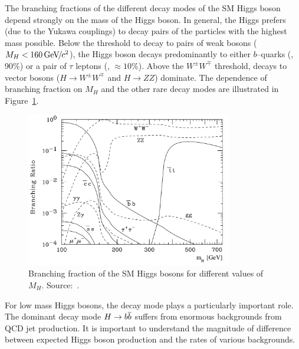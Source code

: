 The branching fractions of the different decay modes of the SM Higgs boson
depend strongly on the mass of the Higgs boson.  In general, the Higgs prefers
(due to the Yukawa couplings) to decay pairs of the particles with the highest
mass possible.  Below the threshold to decay to pairs of weak bosons ($M_H <
160 {\,\text{Ge\hspace{-.08em}V\hspace{-0.16em}/\hspace{-0.08em}}c^\text{2}}$), the Higgs boson decays predominantly to either $b$--quarks (\bbbar,
90\%) or a pair of $\tau$ leptons (\TT, $\approx 10\%$).  Above the $W^\pm W^\mp$
threshold, decays to vector bosons ($H \to W^\pm W^\mp$ and $H \to ZZ$)
dominate.  The dependence of branching fraction on $M_H$ and the other rare
decay modes are illustrated in Figure~\ref{fig:SMHiggsBR}.  
\begin{figure}
  \centering
  \includegraphics[width=90mm,angle=0]{theory_chapter/figures/smhiggsbr2_mh.pdf}
  \caption[SM Higgs boson branching fractions]{Branching fraction of the SM Higgs
  bosons for different values of $M_H$. Source:~\cite{PDG}.}
  \label{fig:SMHiggsBR}
\end{figure}
For low mass Higgs bosons,
the \TT decay mode plays a particularly important role.  The dominant decay mode
$H \to {b\overline{b}}$ suffers from enormous backgrounds from QCD jet production.
It is important to understand the magnitude of difference between expected Higgs
boson production and the rates of various backgrounds.
